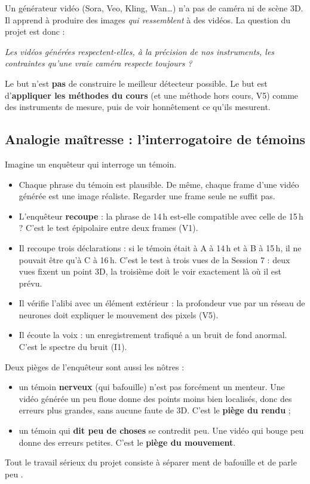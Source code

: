 \documentclass[11pt,a4paper]{article}
\begin{document}
Un générateur vidéo (Sora, Veo, Kling, Wan\ldots) n'a pas de caméra ni de scène 3D. Il apprend à
produire des images \emph{qui ressemblent} à des vidéos. La question du projet est donc :
\begin{center}
\emph{Les vidéos générées respectent-elles, à la précision de nos instruments, les contraintes
qu'une vraie caméra respecte toujours ?}
\end{center}

Le but n'est \textbf{pas} de construire le meilleur détecteur possible. Le but est d'\textbf{appliquer les
méthodes du cours} (et une méthode hors cours, V5) comme des instruments de mesure, puis de voir
honnêtement ce qu'ils mesurent.

\subsection{Analogie maîtresse : l'interrogatoire de témoins}

Imagine un enquêteur qui interroge un témoin.
\begin{itemize}
  \item Chaque phrase du témoin est plausible. De même, chaque frame d'une vidéo générée est
        une image réaliste. Regarder une frame seule ne suffit pas.
  \item L'enquêteur \textbf{recoupe} : la phrase de 14\,h est-elle compatible avec celle de 15\,h ?
        C'est le test épipolaire entre deux frames (V1).
  \item Il recoupe trois déclarations : si le témoin était à A à 14\,h et à B à 15\,h, il ne pouvait
        être qu'à C à 16\,h. C'est le test à trois vues de la Session 7 : deux vues fixent un point
        3D, la troisième doit le voir exactement là où il est prévu.
  \item Il vérifie l'alibi avec un élément extérieur : la profondeur vue par un réseau de neurones
        doit expliquer le mouvement des pixels (V5).
  \item Il écoute la voix : un enregistrement trafiqué a un bruit de fond anormal. C'est le spectre
        du bruit (I1).
\end{itemize}
Deux pièges de l'enquêteur sont aussi les nôtres :
\begin{itemize}
  \item un témoin \textbf{nerveux} (qui bafouille) n'est pas forcément un menteur. Une vidéo générée
        un peu floue donne des points moins bien localisés, donc des erreurs plus grandes, sans
        aucune faute de 3D. C'est le \textbf{piège du rendu} ;
  \item un témoin qui \textbf{dit peu de choses} se contredit peu. Une vidéo qui bouge peu donne des
        erreurs petites. C'est le \textbf{piège du mouvement}.
\end{itemize}
Tout le travail sérieux du projet consiste à séparer \og ment \fg{} de \og bafouille \fg{} et de
\og parle peu \fg.
\end{document}
